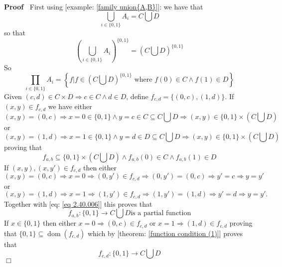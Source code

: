 \documentclass{book}
\newcommand{\tmop}[1]{\ensuremath{\operatorname{#1}}}
\newenvironment{proof}{\noindent\textbf{Proof\ }}{\hspace*{\fill}$\Box$\medskip}
\begin{document}
\begin{proof}
  First using [example: \ref{family union{A,B}}]: we have that
  \begin{equation}
    \label{eq 2.38.006} \bigcup_{i \in \{ 0, 1 \}} A_i = C \bigcup D
  \end{equation}
  so that
  \begin{equation}
    \label{eq 2.39.006} \left( \bigcup_{i \in \{ 0, 1 \}} A_i \right)^{\{ 0, 1
    \}} = \left( C \bigcup D \right)^{\{ 0, 1 \}}
  \end{equation}
  So
  \begin{equation}
    \label{eq 2.40.007} \prod_{i \in \{ 0, 1 \}} A_i = \left\{ f|f \in \left(
    C \bigcup D \right)^{\{ 0, 1 \}} \text{ where $f (0) \in C \wedge f (1)
    \in D$} \right\}
  \end{equation}
  Given $(c, d) \in C \times D \Rightarrow c \in C \wedge d \in D$, define
  $f_{c, d} = \{ (0, c), (1, d) \}$. If $(x, y) \in f_{c, d}$ we have either
  \[ (x, y) = (0, c) \Rightarrow x = 0 \in \{ 0, 1 \} \wedge y = c \in C
     \subseteq C \bigcup D \Rightarrow (x, y) \in \{ 0, 1 \} \times \left( C
     \bigcup D \right) \]
  or
  \[ (x, y) = (1, d) \Rightarrow x = 1 \in \{ 0, 1 \} \wedge y = d \in D
     \subseteq C \bigcup D \Rightarrow (x, y) \in \{ 0, 1 \} \times \left( C
     \bigcup D \right) \]
  proving that
  \begin{equation}
    \label{eq 2.40.006} f_{a, b} \subseteq \{ 0, 1 \} \times \left( C \bigcup
    D \right) \wedge f_{a, b} (0) \in C \wedge f_{a, b} (1) \in D
  \end{equation}
  If $(x, y), (x, y') \in f_{c, d}$ then either
  \[ (x, y) = (0, c) \Rightarrow x = 0 \Rightarrow (0, y') \in f_{c, d}
     \Rightarrow (0, y') = (0, c) \Rightarrow y' = c \Rightarrow y = y' \]
  or
  \[ (x, y) = (1, d) \Rightarrow x = 1 \Rightarrow (1, y') \in f_{c, d}
     \Rightarrow (1, y') = (1, d) \Rightarrow y' = d \Rightarrow y = y' . \]
  Together with [eq: \ref{eq 2.40.006}] this proves that
  \begin{equation}
    \label{eq 2.41.006} f_{a, b} : \{ 0, 1 \} \rightarrow C \bigcup D \text{
    is a partial function}
  \end{equation}
  If $x \in \{ 0, 1 \}$ then either $x = 0 \Rightarrow (0, c) \in f_{c, d}$ or
  $x = 1 \Rightarrow (1, d) \in f_{c, d}$ proving that $\{ 0, 1 \} \subseteq
  \tmop{dom} (f_{c, d})$ which by [theorem: \ref{function condition (1)}]
  proves that
  \begin{equation}
    \label{eq 2.42.006} f_{c, d} : \{ 0, 1 \} \rightarrow C \bigcup D \text{
}
\end{equation}
\end{proof}
\end{document}
